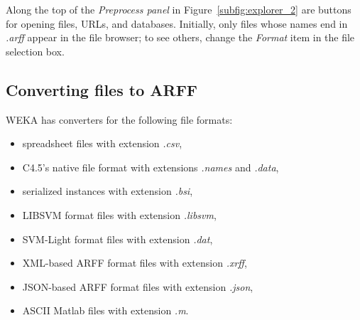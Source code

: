 Along the top of the \textit{Preprocess panel} in
Figure~\ref{subfig:explorer_2} are buttons for opening files, URLs,
and databases. Initially, only files whose names end in \textit{.arff}
appear in the file browser; to see others, change the \textit{Format}
item in the file selection box.

\subsection{Converting files to ARFF}

WEKA has converters for the following file formats: 

\begin{itemize}
\item spreadsheet files with extension \textit{.csv},
\item C4.5's native file format with extensions \textit{.names} and \textit{.data},
\item serialized instances with extension \textit{.bsi},
\item LIBSVM format files with extension \textit{.libsvm},
\item SVM-Light format files with extension \textit{.dat},
\item XML-based ARFF format files with extension \textit{.xrff},
\item JSON-based ARFF format files with extension \textit{.json},
\item ASCII Matlab files with extension \textit{.m}.
\end{itemize}

